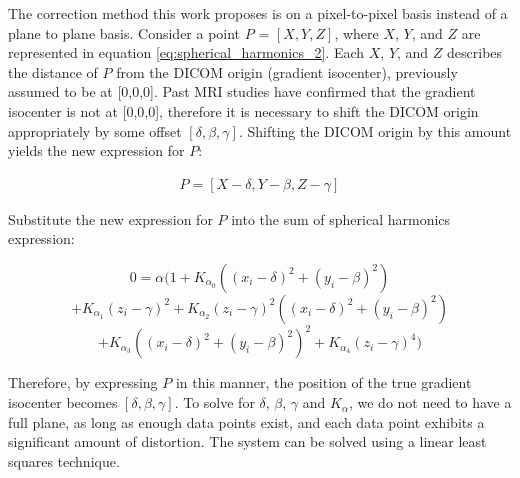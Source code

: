 The correction method this work proposes is on a pixel-to-pixel basis instead of a plane to plane basis.
Consider a point $P$ = $[X,Y,Z]$, where $X$, $Y$, and $Z$ are represented in equation \ref{eq:spherical_harmonics_2}. Each $X$, $Y$, and $Z$ describes the distance of $P$ from the DICOM origin (gradient isocenter), previously assumed to be at [0,0,0].  Past MRI studies have confirmed that the gradient isocenter is not at [0,0,0], therefore it is necessary to shift the DICOM origin appropriately by some offset $[\delta,\beta,\gamma]$.  Shifting the DICOM origin by this amount yields the new expression for $P$:

\begin{eqnarray}
P = [X - \delta, Y - \beta, Z - \gamma]
\end{eqnarray}

Substitute the new expression for $P$ into the sum of spherical harmonics expression:

$$0 = \alpha(1 + K_{\alpha_0}((x_i - \delta)^2 + (y_i - \beta)^2)$$
$$+ K_{\alpha_1}(z_i - \gamma)^2 + K_{\alpha_2}(z_i - \gamma)^2((x_i - \delta)^2 + (y_i - \beta)^2)$$
$$+ K_{\alpha_3}((x_i - \delta)^2 + (y_i - \beta)^2)^2 + K_{\alpha_4}(z_i - \gamma)^4)$$

Therefore, by expressing $P$ in this manner, the position of the true gradient isocenter becomes
$[\delta, \beta, \gamma]$. To solve for $\delta$, $\beta$, $\gamma$ and $K_{\alpha}$, we do not need
to have a full plane, as long as enough data points exist, and each data point exhibits a significant amount of distortion. The system can be solved using a linear least squares technique.



